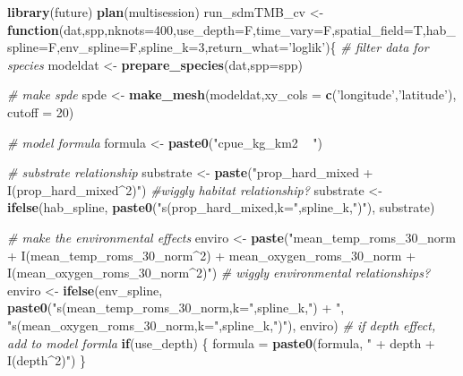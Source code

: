 \documentclass[
]{article}
\newenvironment{Shaded}{\begin{snugshade}}{\end{snugshade}}
\newcommand{\CommentTok}[1]{\textcolor[rgb]{0.56,0.35,0.01}{\textit{#1}}}
\newcommand{\ControlFlowTok}[1]{\textcolor[rgb]{0.13,0.29,0.53}{\textbf{#1}}}
\newcommand{\DataTypeTok}[1]{\textcolor[rgb]{0.13,0.29,0.53}{#1}}
\newcommand{\DecValTok}[1]{\textcolor[rgb]{0.00,0.00,0.81}{#1}}
\newcommand{\KeywordTok}[1]{\textcolor[rgb]{0.13,0.29,0.53}{\textbf{#1}}}
\newcommand{\NormalTok}[1]{#1}
\newcommand{\StringTok}[1]{\textcolor[rgb]{0.31,0.60,0.02}{#1}}
\begin{document}
\begin{Shaded}
\begin{Highlighting}[]
\KeywordTok{library}\NormalTok{(future)}
\KeywordTok{plan}\NormalTok{(multisession)}
\NormalTok{run_sdmTMB_cv <-}\StringTok{ }\ControlFlowTok{function}\NormalTok{(dat,spp,}\DataTypeTok{nknots=}\DecValTok{400}\NormalTok{,}\DataTypeTok{use_depth=}\NormalTok{F,}\DataTypeTok{time_vary=}\NormalTok{F,}\DataTypeTok{spatial_field=}\NormalTok{T,}\DataTypeTok{hab_spline=}\NormalTok{F,}\DataTypeTok{env_spline=}\NormalTok{F,}\DataTypeTok{spline_k=}\DecValTok{3}\NormalTok{,}\DataTypeTok{return_what=}\StringTok{'loglik'}\NormalTok{)\{}
  \CommentTok{# filter data for species}
\NormalTok{  modeldat <-}\StringTok{ }\KeywordTok{prepare_species}\NormalTok{(dat,}\DataTypeTok{spp=}\NormalTok{spp)}
  
  \CommentTok{# make spde}
\NormalTok{  spde <-}\StringTok{ }\KeywordTok{make_mesh}\NormalTok{(modeldat,}\DataTypeTok{xy_cols =} \KeywordTok{c}\NormalTok{(}\StringTok{'longitude'}\NormalTok{,}\StringTok{'latitude'}\NormalTok{), }
                   \DataTypeTok{cutoff =} \DecValTok{20}\NormalTok{)}
  
  \CommentTok{# model formula}
\NormalTok{  formula <-}\StringTok{ }\KeywordTok{paste0}\NormalTok{(}\StringTok{"cpue_kg_km2 ~ "}\NormalTok{)}
  
  \CommentTok{# substrate relationship}
\NormalTok{  substrate <-}\StringTok{ }\KeywordTok{paste}\NormalTok{(}\StringTok{"prop_hard_mixed + I(prop_hard_mixed^2)"}\NormalTok{)}
  \CommentTok{#wiggly habitat relationship?}
\NormalTok{  substrate <-}\StringTok{ }\KeywordTok{ifelse}\NormalTok{(hab_spline, }\KeywordTok{paste0}\NormalTok{(}\StringTok{"s(prop_hard_mixed,k="}\NormalTok{,spline_k,}\StringTok{")"}\NormalTok{),}
\NormalTok{                      substrate)}
  
  \CommentTok{# make the environmental effects}
\NormalTok{  enviro <-}\StringTok{ }\KeywordTok{paste}\NormalTok{(}\StringTok{"mean_temp_roms_30_norm + I(mean_temp_roms_30_norm^2) + mean_oxygen_roms_30_norm + I(mean_oxygen_roms_30_norm^2)"}\NormalTok{)}
  \CommentTok{# wiggly environmental relationships?}
\NormalTok{  enviro <-}\StringTok{ }\KeywordTok{ifelse}\NormalTok{(env_spline, }\KeywordTok{paste0}\NormalTok{(}\StringTok{"s(mean_temp_roms_30_norm,k="}\NormalTok{,spline_k,}\StringTok{") + "}\NormalTok{,}
                                      \StringTok{"s(mean_oxygen_roms_30_norm,k="}\NormalTok{,spline_k,}\StringTok{")"}\NormalTok{),}
\NormalTok{                   enviro)}
  \CommentTok{# if depth effect, add to model formla}
  \ControlFlowTok{if}\NormalTok{(use_depth) \{}
\NormalTok{    formula =}\StringTok{ }\KeywordTok{paste0}\NormalTok{(formula, }\StringTok{" + depth + I(depth^2)"}\NormalTok{)}
\NormalTok{  \}}
  

\end{Highlighting}
\end{Shaded}
\end{document}
